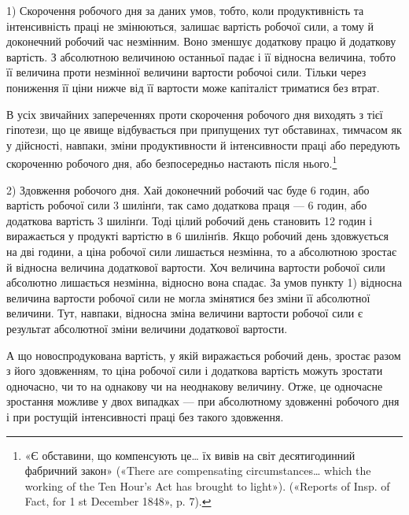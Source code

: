 \parcont{}  %
1) Скорочення робочого дня за даних умов, тобто, коли продуктивність
та інтенсивність праці не змінюються, залишає
вартість робочої сили, а тому й доконечний робочий час незмінним.
Воно зменшує додаткову працю й додаткову вартість. З абсолютною
величиною останньої падає і її відносна величина, тобто
її величина проти незмінної величини вартости робочоі сили.
Тільки через пониження її ціни нижче від її вартости може капіталіст
триматися без втрат.

В усіх звичайних запереченнях проти скорочення робочого
дня виходять з тієї гіпотези, що це явище відбувається при припущених
тут обставинах, тимчасом як у дійсності, навпаки, зміни
продуктивности й інтенсивности праці або передують скороченню
робочого дня, або безпосередньо настають після нього.\footnote{
«Є обставини, що компенсують це\dots{} їх вивів на світ десятигодинний
фабричний закон» («There are compensating circumstances\dots{} which
the working of the Ten Hour’s Act has brought to light»). («Reports of
Insp. of Fact, for 1 st December 1848», p. 7).
}

2) Здовження робочого дня. Хай доконечний робочий час
буде 6 годин, або вартість робочої сили 3 шилінґи, так само додаткова
праця — 6 годин, або додаткова вартість 3 шилінґи.
Тоді цілий робочий день становить 12 годин і виражається у
продукті вартістю в 6 шилінґів. Якщо робочий день здовжується
на дві години, а ціна робочої сили лишається незмінна, то а
абсолютною зростає й відносна величина додаткової вартости.
Хоч величина вартости робочої сили абсолютно лишається незмінна,
відносно вона спадає. За умов пункту 1) відносна величина
вартости робочої сили не могла змінятися без зміни її абсолютної
величини. Тут, навпаки, відносна зміна величини вартости
робочої сили є результат абсолютної зміни величини додаткової
вартости.

А що новоспродукована вартість, у якій виражається робочий
день, зростає разом з його здовженням, то ціна робочої сили
і додаткова вартість можуть зростати одночасно, чи то на однакову
чи на неоднакову величину. Отже, це одночасне зростання
можливе у двох випадках — при абсолютному здовженні робочого
дня і при ростущій інтенсивності праці без такого здовження.

